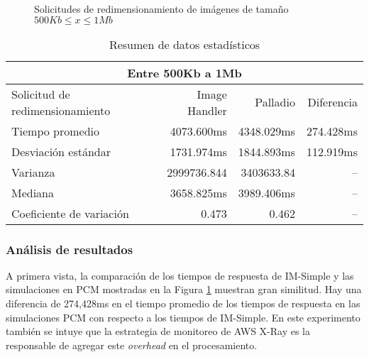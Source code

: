 \begin{figure}[h]
\hspace{-1cm}
\caption{Solicitudes de redimensionamiento de imágenes de tamaño $500Kb \leq x \leq 1Mb$}
\label{fig:comparacion-imsimple-palladio-1mb}
\end{figure}

\begin{table}
    \centering
    \begin{tabular}{l|r|r|r}
        \toprule[1.5pt]
         \multicolumn{4}{c}{\textbf{Entre 500Kb a 1Mb}} \\
        \midrule
        Solicitud de redimensionamiento  & Image Handler & Palladio & Diferencia\\  
        \midrule        
        Tiempo promedio  & 4073.600ms & 4348.029ms & 274.428ms\\
        Desviación estándar & 1731.974ms & 1844.893ms & 112.919ms\\
        Varianza & 2999736.844 & 3403633.84 & --\\
        Mediana & 3658.825ms & 3989.406ms & -- \\
        Coeficiente de variación & 0.473 & 0.462 & -- \\                      
        \bottomrule[1.5pt]
    \end{tabular}
    \caption{Resumen de datos estadísticos}
    \label{table:datos-estadisticos-hasta-1mb}
\end{table}

\subsubsection{Análisis de resultados}
A primera vista, la comparación de los tiempos de respuesta de IM-Simple y las simulaciones en PCM mostradas en la Figura \ref{fig:comparacion-imsimple-palladio-1mb} muestran gran similitud. Hay una diferencia de 274,428ms en el tiempo promedio de los tiempos de respuesta en las simulaciones PCM con respecto a los tiempos de IM-Simple. En este experimento también se intuye que la estrategia de monitoreo de AWS X-Ray es la responsable de agregar este \emph{overhead} en el procesamiento.

